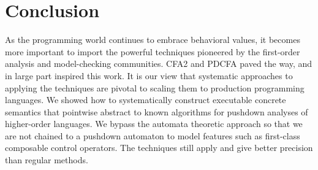 \section{Conclusion}

As the programming world continues to embrace behavioral values, it becomes more important to import the powerful techniques pioneered by the first-order analysis and model-checking communities.
%
CFA2 and PDCFA paved the way, and in large part inspired this work.
%
It is our view that systematic approaches to applying the techniques are pivotal to scaling them to production programming languages.
%
We showed how to systematically construct executable concrete semantics that pointwise abstract to known algorithms for pushdown analyses of higher-order languages.
%
We bypass the automata theoretic approach so that we are not chained to a pushdown automaton to model features such as first-class composable control operators.
%
The techniques still apply and give better precision than regular methods.


%

